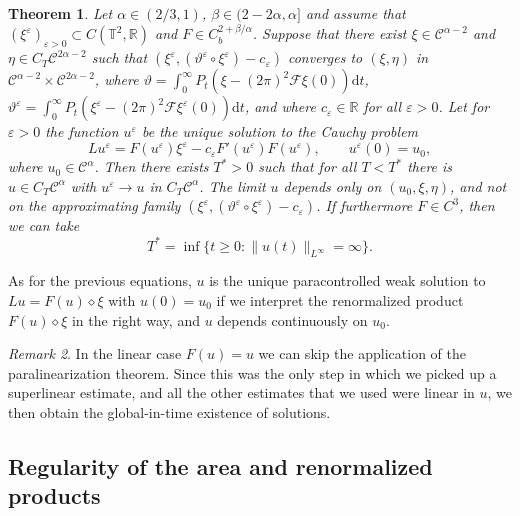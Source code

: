 \documentclass[a4paper,11pt]{article}
\newcommand{\mathd}{\mathrm{d}}
\newtheorem{theorem}{Theorem}[section]
\theoremstyle{remark}
\newtheorem{remark}[theorem]{Remark}
\newcommand{\R}{\mathbb{R}}
\newcommand{\CC}{\ensuremath{\mathscr{C}}}
\newcommand{\CF}{\ensuremath{\mathscr{F}}}
\newcommand{\reso}{\,\mathord{\circ}\,}
\begin{document}
\begin{theorem}\label{theorem:pam existence uniqueness}
  Let $\alpha \in ( 2/3,1 )$, $\beta \in (2-2\alpha, \alpha]$ and assume that $( \xi^{\varepsilon})_{\varepsilon >0} \subset C(\mathbb{T}^2,\R)$ and $F \in C^{2+\beta/\alpha}_{b}$. Suppose that there exist $\xi \in \CC^{\alpha -2}$ and $\eta \in C_{T} \CC^{2 \alpha -2}$ such that $( \xi^{\varepsilon}, (\vartheta^{\varepsilon} \reso   \xi^{\varepsilon} ) -c_{\varepsilon} )$
  converges to $( \xi, \eta )$ in $\CC^{\alpha -2} \times \CC^{2 \alpha -2}$, where $\vartheta = \int_0^\infty P_t (\xi - (2\pi)^2 \CF \xi(0))\mathd t$, $\vartheta^{\varepsilon} = \int_0^\infty P_t (\xi^\varepsilon - (2\pi)^2 \CF \xi^\varepsilon(0))\mathd t$, and where $c_{\varepsilon} \in \mathbb{R}$ for all $\varepsilon >0$.
  Let for $\varepsilon >0$ the function $u^{\varepsilon}$ be the unique
  solution to the Cauchy problem
  \[
     L u^{\varepsilon} =F ( u^{\varepsilon} ) \xi^{\varepsilon} -c_{\varepsilon} F' ( u^{\varepsilon} ) F ( u^{\varepsilon} ) , \hspace{2em} u^{\varepsilon} ( 0 ) =u_{0},
  \]
  where $u_{0} \in \CC^{\alpha}$. Then there exists $T^\ast > 0$ such that for all $T < T^\ast$ there is $u \in C_{T} \CC^{\alpha}$ with
  $u^{\varepsilon} \rightarrow u$ in $C_{T} \CC^{\alpha}$. The limit $u$ depends only on $( u_{0} , \xi , \eta )$, and not on the approximating family $( \xi^{\varepsilon} , (\vartheta^{\varepsilon} \reso   \xi^{\varepsilon} ) -c_{\varepsilon} )$. If furthermore $F \in C^3$, then we can take
  \[
     T^\ast = \inf \{ t \geqslant 0: \|u(t) \|_{L^\infty} = \infty\}.
  \]
\end{theorem}
As for the previous equations, $u$ is the unique paracontrolled weak solution to $L u=F ( u )\diamond \xi$ with $u ( 0 ) =u_{0}$ if we interpret the renormalized product $F ( u ) \diamond\xi$ in the right way, and $u$ depends continuously on $u_0$.

\begin{remark}
   In the linear case $F(u) = u$ we can skip the application of the paralinearization theorem. Since this was the only step in which we picked up a superlinear estimate, and all the other estimates that we used were linear in $u$, we then obtain the global-in-time existence of solutions.
\end{remark}






\subsection{Regularity of the area and renormalized products}
\end{document}
